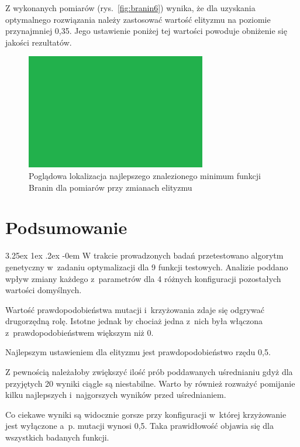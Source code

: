 \documentclass[11pt, a4paper]{article}
\makeatletter
\newcommand{\fbi}{\leavevmode{\parindent=1em\indent}}
\renewcommand\paragraph{\@startsection{paragraph}{5}{\z@}
  {3.25ex \@plus1ex \@minus.2ex}
  {-0em}
  {\normalfont\normalsize\bfseries}}
\makeatother
\begin{document}
\fbi
Z wykonanych pomiarów (rys.~\ref{fig:branin6}) wynika, że dla uzyskania optymalnego rozwiązania należy zastosować wartość elityzmu na poziomie przynajmniej 0,35. Jego ustawienie poniżej tej wartości powoduje obniżenie się jakości rezultatów.

\begin{figure}[H]
	\centering
	\includegraphics[width=0.7\textwidth]{./assets/test.png}
	\caption{Poglądowa lokalizacja najlepszego znalezionego minimum funkcji Branin dla pomiarów przy zmianach elityzmu}
	\label{fig:branin6elt}
\end{figure}

\newpage
\section{Podsumowanie}
\paragraph{}
W trakcie prowadzonych badań przetestowano algorytm genetyczny w~zadaniu optymalizacji dla 9 funkcji testowych. Analizie poddano wpływ zmiany każdego z~parametrów dla 4 różnych konfiguracji pozostałych wartości domyślnych.

\fbi
Wartość prawdopodobieństwa mutacji i~krzyżowania zdaje się odgrywać drugorzędną rolę. Istotne jednak by chociaż jedna z~nich była włączona z~prawdopodobieństwem większym niż 0.

\fbi
Najlepszym ustawieniem dla elityzmu jest prawdopodobieństwo rzędu 0,5.

\fbi
Z pewnością należałoby zwiększyć ilość prób poddawanych uśrednianiu gdyż dla przyjętych 20 wyniki ciągle są niestabilne. Warto by również rozważyć pomijanie kilku najlepszych i~najgorszych wyników przed uśrednianiem.

\fbi
Co ciekawe wyniki są widocznie gorsze przy konfiguracji w~której krzyżowanie jest wyłączone a~p. mutacji wynosi 0,5. Taka prawidłowość objawia się dla wszystkich badanych funkcji.
\end{document}
